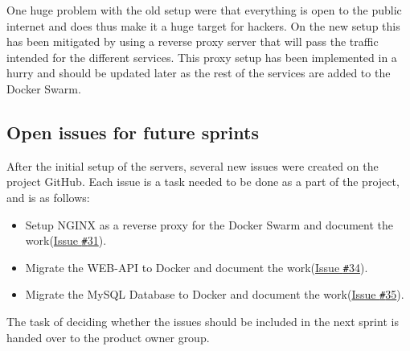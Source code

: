 One huge problem with the old setup were that everything is open to the public internet and does thus make it a huge target for hackers. 
On the new setup this has been mitigated by using a reverse proxy server that will pass the traffic intended for the different services. 
This proxy setup has been implemented in a hurry and should be updated later as the rest of the services are added to the Docker Swarm. 

\subsection{Open issues for future sprints}
After the initial setup of the servers, several new issues were created on the project GitHub.
Each issue is a task needed to be done as a part of the project, and is as follows:

\begin{itemize}
\item Setup NGINX as a reverse proxy for the Docker Swarm and document the work(\href{https://github.com/aau-giraf/wiki/issues/31}{Issue \texttt{\#}31}).
\item Migrate the WEB-API to Docker and document the work(\href{https://github.com/aau-giraf/wiki/issues/34}{Issue \texttt{\#}34}).
\item Migrate the MySQL Database to Docker and document the work(\href{https://github.com/aau-giraf/wiki/issues/35}{Issue \texttt{\#}35}).
\end{itemize}

The task of deciding whether the issues should be included in the next sprint is handed over to the product owner group.
